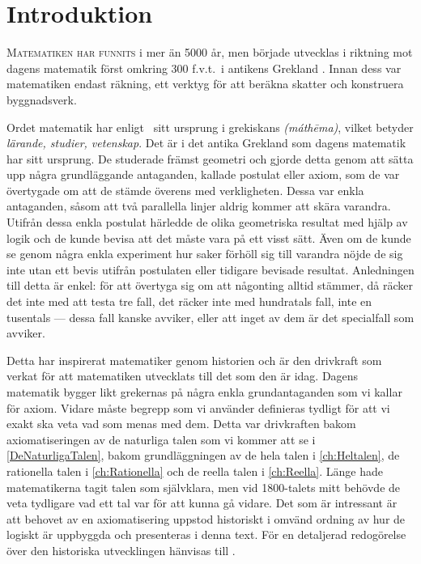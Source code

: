 %
%
%
%
\chapter{Introduktion}\label{Introduktion}
\lettrine{M}{atematiken har funnits} i mer än 5000 år, men började utvecklas i 
riktning mot dagens matematik först omkring 300 f.v.t.\ i antikens Grekland 
\cite{Kline1990mtf1}.
Innan dess var matematiken endast räkning, ett verktyg för att beräkna skatter 
och konstruera byggnadsverk.

Ordet matematik har enligt~\cite{OED2013maths} sitt ursprung i grekiskans 
\emph{ (m{\'a}th{\=e}ma)}, vilket betyder \emph{lärande, 
studier, vetenskap}.
Det är i det antika Grekland som dagens matematik har sitt ursprung.
De studerade främst geometri och gjorde detta genom att sätta upp några 
grundläggande antaganden, kallade postulat eller axiom, som de var övertygade 
om att de stämde överens med verkligheten.
Dessa var enkla antaganden, såsom att två parallella linjer aldrig kommer att 
skära varandra.
Utifrån dessa enkla postulat härledde de olika geometriska resultat med hjälp 
av logik och de kunde bevisa att det måste vara på ett visst sätt.
Även om de kunde se genom några enkla experiment hur saker förhöll sig till 
varandra nöjde de sig inte utan ett bevis utifrån postulaten eller tidigare 
bevisade resultat.
Anledningen till detta är enkel: för att övertyga sig om att någonting alltid 
stämmer, då räcker det inte med att testa tre fall, det räcker inte med 
hundratals fall, inte en tusentals --- dessa fall kanske avviker, eller att 
inget av dem är det specialfall som avviker.

Detta har inspirerat matematiker genom historien och är den drivkraft som 
verkat för att matematiken utvecklats till det som den är idag.
Dagens matematik bygger likt grekernas på några enkla grundantaganden som vi 
kallar för axiom.
Vidare måste begrepp som vi använder definieras tydligt för att vi exakt ska 
veta vad som menas med dem.
Detta var drivkraften bakom axiomatiseringen av de naturliga talen som vi 
kommer att se i \cref{DeNaturligaTalen}, bakom grundläggningen av de hela 
talen i \cref{ch:Heltalen}, de rationella talen i 
\cref{ch:Rationella} och de reella talen i \cref{ch:Reella}.
Länge hade matematikerna tagit talen som självklara, men vid 1800-talets mitt 
behövde de veta tydligare vad ett tal var för att kunna gå vidare.
Det som är intressant är att behovet av en axiomatisering uppstod historiskt i 
omvänd ordning av hur de logiskt är uppbyggda och presenteras i denna text.
För en detaljerad redogörelse över den historiska utvecklingen hänvisas till 
\citet{Kline1990mtf3}.

